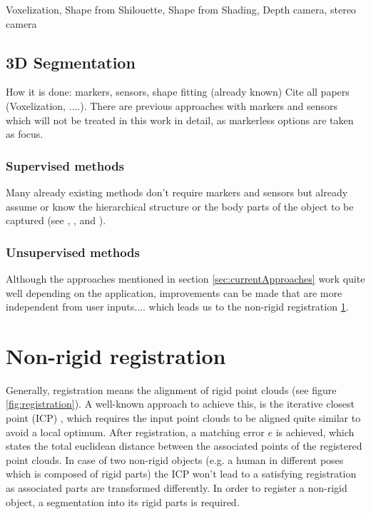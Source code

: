 Voxelization, Shape from Shilouette, Shape from Shading, Depth camera, stereo camera
%
%
\subsection{3D Segmentation}
\label{sec:segmentation}
%
%
How it is done: markers, sensors, shape fitting (already known)
Cite all papers (Voxelization, ....). There are previous approaches with markers and sensors which will not be treated in this work in detail, as markerless options are taken as focus.

\subsubsection{Supervised methods}
Many already existing methods don't require markers and sensors but already assume or know the hierarchical structure or the body parts of the object to be captured (see \cite{multiLayerSkeleton}, \cite{baker2005shape}, \cite{de2008hierarchical} and \cite{michoud2007real}).

\subsubsection{Unsupervised methods}
Although the approaches mentioned in section \ref{sec:currentApproaches} work quite well depending on the application, improvements can be made that are more independent from user inputs.... which leads us to the non-rigid registration \ref{nonrigidregistration}.

\section{Non-rigid registration}
\label{nonrigidregistration}

Generally, registration means the alignment of rigid point clouds (see figure \ref{fig:registration}). A well-known approach to achieve this, is the iterative closest point (ICP) \cite{ICP}, which requires the input point clouds to be aligned quite similar to avoid a local optimum. After registration, a matching error $e$ is achieved, which states the total euclidean distance between the associated points of the registered point clouds. In case of two non-rigid objects (e.g. a human in different poses which is composed of rigid parts) the ICP won't lead to a satisfying registration as associated parts are transformed differently. In order to register a non-rigid object, a segmentation into its rigid parts is required.

